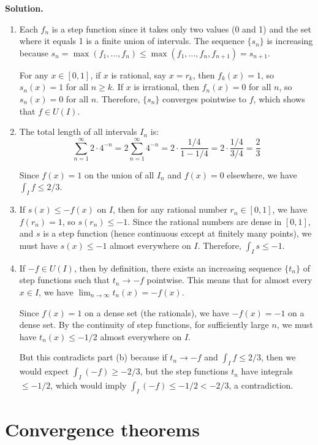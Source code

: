 \noindent\textbf{Solution.}
\begin{enumerate}[label=(\alph*)]
    \item Each $f_n$ is a step function since it takes only two values (0 and 1) and the set where it equals 1 is a finite union of intervals. The sequence $\{s_n\}$ is increasing because $s_n = \max(f_1, \ldots, f_n) \leq \max(f_1, \ldots, f_n, f_{n+1}) = s_{n+1}$.

    For any $x \in [0, 1]$, if $x$ is rational, say $x = r_k$, then $f_k(x) = 1$, so $s_n(x) = 1$ for all $n \geq k$. If $x$ is irrational, then $f_n(x) = 0$ for all $n$, so $s_n(x) = 0$ for all $n$. Therefore, $\{s_n\}$ converges pointwise to $f$, which shows that $f \in U(I)$.

    \item The total length of all intervals $I_n$ is:
    \[\sum_{n=1}^{\infty} 2 \cdot 4^{-n} = 2 \sum_{n=1}^{\infty} 4^{-n} = 2 \cdot \frac{1/4}{1 - 1/4} = 2 \cdot \frac{1/4}{3/4} = \frac{2}{3}\]
    
    Since $f(x) = 1$ on the union of all $I_n$ and $f(x) = 0$ elsewhere, we have $\int_I f \leq 2/3$.

    \item If $s(x) \leq -f(x)$ on $I$, then for any rational number $r_n \in [0, 1]$, we have $f(r_n) = 1$, so $s(r_n) \leq -1$. Since the rational numbers are dense in $[0, 1]$, and $s$ is a step function (hence continuous except at finitely many points), we must have $s(x) \leq -1$ almost everywhere on $I$. Therefore, $\int_I s \leq -1$.

    \item If $-f \in U(I)$, then by definition, there exists an increasing sequence $\{t_n\}$ of step functions such that $t_n \to -f$ pointwise. This means that for almost every $x \in I$, we have $\lim_{n \to \infty} t_n(x) = -f(x)$.

    Since $f(x) = 1$ on a dense set (the rationals), we have $-f(x) = -1$ on a dense set. By the continuity of step functions, for sufficiently large $n$, we must have $t_n(x) \leq -1/2$ almost everywhere on $I$.

    But this contradicts part (b) because if $t_n \to -f$ and $\int_I f \leq 2/3$, then we would expect $\int_I (-f) \geq -2/3$, but the step functions $t_n$ have integrals $\leq -1/2$, which would imply $\int_I (-f) \leq -1/2 < -2/3$, a contradiction.
\end{enumerate}

\section{Convergence theorems}

